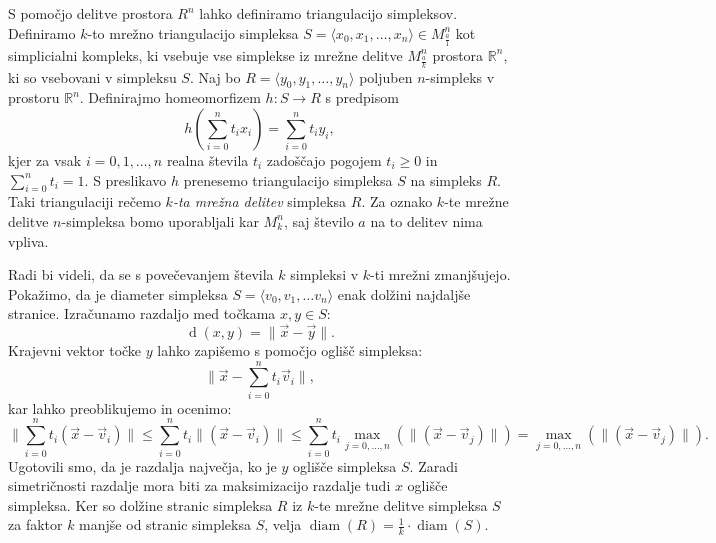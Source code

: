 \documentclass[mat1]{fmfdelo}
\newcommand{\R}{\mathbb R}
\DeclareMathOperator{\diam}{diam}
\DeclareMathOperator{\dist}{d}
\newcommand{\0}{0}
\begin{document}
S pomočjo delitve prostora $R^n$ lahko definiramo triangulacijo simpleksov. Definiramo $k$-to mrežno triangulacijo simpleksa $S = \langle x_0, x_1, \dots, x_n \rangle \in M^n_{\frac{a}{1}}$ kot simplicialni kompleks, ki vsebuje vse simplekse iz mrežne delitve $M^n_{\frac{a}{k}}$ prostora $\R^n$, ki so vsebovani v simpleksu $S$.
Naj bo $R = \langle y_0, y_1, \dots, y_n \rangle$ poljuben $n$-simpleks v prostoru $\R^n$. Definirajmo homeomorfizem $h : S \to R$ s predpisom
$$h \left( \sum_{i=0}^n t_i x_i \right) = \sum_{i=0}^n t_i y_i,$$
kjer za vsak $i=0, 1, \dots, n$ realna števila $t_i$ zadoščajo pogojem $t_i \geq 0$ in $\sum_{i=0}^n t_i = 1$.
S preslikavo $h$ prenesemo triangulacijo simpleksa $S$ na simpleks $R$. Taki triangulaciji rečemo \emph{$k$-ta mrežna delitev} simpleksa $R$. Za oznako $k$-te mrežne delitve $n$-simpleksa bomo uporabljali kar $M_k^n$, saj število $a$ na to delitev nima vpliva. 

Radi bi videli, da se s povečevanjem števila $k$ simpleksi v $k$-ti mrežni zmanjšujejo.
Pokažimo, da je diameter simpleksa $S = \langle v_0, v_1, \dots v_n \rangle$ enak dolžini najdaljše stranice. Izračunamo razdaljo med točkama $x, y \in S$:
$$\dist(x, y) = \| \vec{x} - \vec{y} \|.$$
Krajevni vektor točke $y$ lahko zapišemo s pomočjo oglišč simpleksa:
$$\| \vec{x} - \sum_{i=0}^n t_i \vec{v}_i \|,$$
kar lahko preoblikujemo in ocenimo:
$$\| \sum_{i=0}^n t_i (\vec{x} - \vec{v}_i)\| \leq \sum_{i=0}^n t_i \| (\vec{x} - \vec{v}_i) \| \leq \sum_{i=0}^n t_i \max_{j=0, \dots, n}(\| (\vec{x} - \vec{v}_j) \|) = \max_{j=0, \dots, n}(\| (\vec{x} - \vec{v}_j) \|).$$
Ugotovili smo, da je razdalja največja, ko je $y$ oglišče simpleksa $S$. Zaradi simetričnosti razdalje mora biti za maksimizacijo razdalje tudi $x$ oglišče simpleksa.
Ker so dolžine stranic simpleksa $R$ iz $k$-te mrežne delitve simpleksa $S$ za faktor $k$ manjše od stranic simpleksa $S$, velja $\diam(R) = \frac{1}{k} \cdot \diam(S)$.
\end{document}
